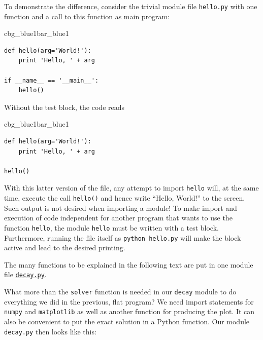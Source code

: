 \documentclass[%
oneside,                 %
final,                   %
10pt]{article}
\newenvironment{_pro_tight}[2]{
   \def\FrameCommand{\color{#2}\vrule width 1mm\normalcolor\colorbox{#1}}
   \FrameRule0.6pt\MakeFramed {\advance\hsize-2mm\FrameRestore}\vskip3mm}
   {\vskip0mm\endMakeFramed}
\newenvironment{pro}[2]{
\bgroup\rmfamily
\fboxsep=0mm\relax
\begin{_pro_tight}{#1}{#2}
\list{}{\parsep=-2mm\parskip=0mm\topsep=0pt\leftmargin=2mm
\rightmargin=2\leftmargin\leftmargin=4pt\relax}
\item\relax}
{\endlist\end{_pro_tight}\egroup}
\newenvironment{notice_mdfboxadmon}[1][]{
\begin{notice_mdfboxmdframed}[frametitle=#1]
}
{
\end{notice_mdfboxmdframed}
}
\begin{document}
To demonstrate the difference, consider the trivial module
file \texttt{hello.py} with one function and a call to this function as main program:

\begin{pro}{cbg_blue1}{bar_blue1}\begin{Verbatim}[numbers=none,fontsize=\fontsize{9pt}{9pt},baselinestretch=0.95,xleftmargin=2mm]
def hello(arg='World!'):
    print 'Hello, ' + arg

if __name__ == '__main__':
    hello()
\end{Verbatim}
\end{pro}
\noindent
Without the test block, the code reads

\begin{pro}{cbg_blue1}{bar_blue1}\begin{Verbatim}[numbers=none,fontsize=\fontsize{9pt}{9pt},baselinestretch=0.95,xleftmargin=2mm]
def hello(arg='World!'):
    print 'Hello, ' + arg

hello()
\end{Verbatim}
\end{pro}
\noindent
With this latter version of the file, any attempt to import \texttt{hello}
will, at the same time, execute the call \texttt{hello()} and hence write
``Hello, World!'' to the screen.  Such output is not desired when
importing a module!  To make import and execution of code independent
for another program that wants to use the function \texttt{hello}, the module
\texttt{hello} must be written with a test block. Furthermore, running the
file itself as \texttt{python hello.py} will make the block active and lead
to the desired printing.


\begin{notice_mdfboxadmon}
The many functions to be explained in the following text are
put in one module file \href{{http://tinyurl.com/ofkw6kc/softeng/decay.py}}{\nolinkurl{decay.py}}.
\end{notice_mdfboxadmon}



What more than the \texttt{solver} function is needed in our \texttt{decay} module
to do everything we did in the previous, flat program?  We need import
statements for \texttt{numpy} and \texttt{matplotlib} as well as another function
for producing the plot. It can also be convenient to put the exact
solution in a Python function.  Our module \texttt{decay.py} then looks like
this:
\end{document}
